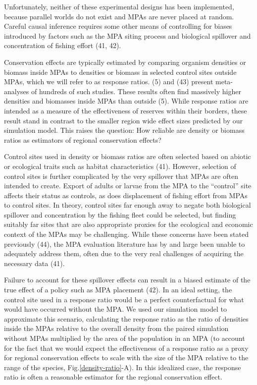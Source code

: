 \documentclass[9pt,twocolumn,twoside,lineno]{pnas-new}
\begin{document}
Unfortunately, neither of these experimental designs has been
implemented, because parallel worlds do not exist and MPAs are never
placed at random. Careful causal inference requires some other means of
controlling for biases introduced by factors such as the MPA siting
process and biological spillover and concentration of fishing effort
(41, 42).

Conservation effects are typically estimated by comparing organism
densities or biomass inside MPAs to densities or biomass in selected
control sites outside MPAs, which we will refer to as response ratios.
(5) and (43) present meta-analyses of hundreds of such studies. These
results often find massively higher densities and biomasses inside MPAs
than outside (5). While response ratios are intended as a measure of the
effectiveness of reserves within their borders, these result stand in
contrast to the smaller region wide effect sizes predicted by our
simulation model. This raises the question: How reliable are density or
biomass ratios as estimators of regional conservation effects?

Control sites used in density or biomass ratios are often selected based
on abiotic or ecological traits such as habitat characteristics (41).
However, selection of control sites is further complicated by the very
spillover that MPAs are often intended to create. Export of adults or
larvae from the MPA to the ``control'' site affects their status as
controls, as does displacement of fishing effort from MPAs to control
sites. In theory, control sites far enough away to negate both
biological spillover and concentration by the fishing fleet could be
selected, but finding suitably far sites that are also appropriate
proxies for the ecological and economic context of the MPAs may be
challenging. While these concerns have been stated previously (44), the
MPA evaluation literature has by and large been unable to adequately
address them, often due to the very real challenges of acquiring the
necessary data (41).

Failure to account for these spillover effects can result in a biased
estimate of the true effect of a policy such as MPA placement (42). In
an ideal setting, the control site used in a response ratio would be a
perfect counterfactual for what would have occurred without the MPA. We
used our simulation model to approximate this scenario, calculating the
response ratio as the ratio of densities inside the MPAs relative to the
overall density from the paired simulation without MPAs multiplied by
the area of the population in an MPA (to account for the fact that we
would expect the effectiveness of a response ratio as a proxy for
regional conservation effects to scale with the size of the MPA relative
to the range of the species, Fig.\ref{density-ratio}-A). In this
idealized case, the response ratio is often a reasonable estimator for
the regional conservation effect.
\end{document}
